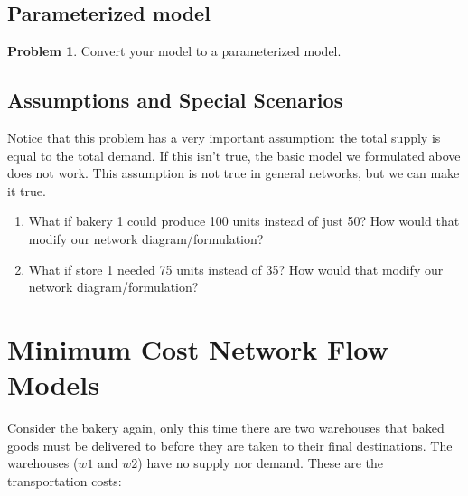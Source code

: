 \documentclass[11pt]{article}
\theoremstyle{definition}
\newtheorem{problem}{Problem}
\begin{document}
\newpage

\subsection{Parameterized model}

\begin{problem}
Convert your model to a parameterized model. 
\end{problem}

\newpage

\subsection{Assumptions and Special Scenarios}

Notice that this problem has a very important assumption: the total supply is equal to the total demand. If this isn't true, the basic model we formulated above does not work. This assumption is not true in general networks, but we can make it true.
\begin{enumerate}
\item What if bakery 1 could produce 100 units instead of just 50? How would that modify our network diagram/formulation? \vfill
\item What if store 1 needed 75 units instead of 35? How would that modify our network diagram/formulation? \vfill \newpage
\end{enumerate}

\section{Minimum Cost Network Flow Models}

Consider the bakery again, only this time there are two warehouses that baked goods must be delivered to before they are taken to their final destinations.  The warehouses ($w1$ and $w2$) have no supply nor demand.  These are the transportation costs:
\end{document}
